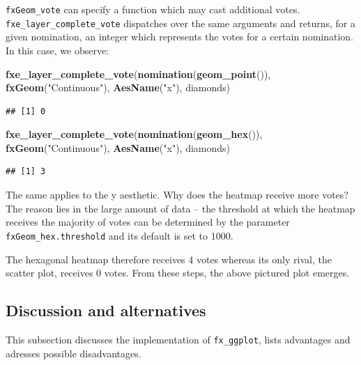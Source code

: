 \documentclass[]{report}
\newenvironment{Shaded}{\begin{snugshade}}{\end{snugshade}}
\newcommand{\KeywordTok}[1]{\textcolor[rgb]{0.13,0.29,0.53}{\textbf{#1}}}
\newcommand{\StringTok}[1]{\textcolor[rgb]{0.31,0.60,0.02}{#1}}
\newcommand{\NormalTok}[1]{#1}
\theoremstyle{definition}
\theoremstyle{definition}
\theoremstyle{definition}
\theoremstyle{remark}
\begin{document}
\texttt{fxGeom\_vote} can specify a function which may cast additional
votes. \texttt{fxe\_layer\_complete\_vote} dispatches over the same
arguments and returns, for a given nomination, an integer which
represents the votes for a certain nomination. In this case, we observe:

\begin{Shaded}
\begin{Highlighting}[]
\KeywordTok{fxe_layer_complete_vote}\NormalTok{(}\KeywordTok{nomination}\NormalTok{(}\KeywordTok{geom_point}\NormalTok{()), }\KeywordTok{fxGeom}\NormalTok{(}\StringTok{"Continuous"}\NormalTok{), }\KeywordTok{AesName}\NormalTok{(}\StringTok{"x"}\NormalTok{), diamonds)}
\end{Highlighting}
\end{Shaded}

\begin{verbatim}
## [1] 0
\end{verbatim}

\begin{Shaded}
\begin{Highlighting}[]
\KeywordTok{fxe_layer_complete_vote}\NormalTok{(}\KeywordTok{nomination}\NormalTok{(}\KeywordTok{geom_hex}\NormalTok{()), }\KeywordTok{fxGeom}\NormalTok{(}\StringTok{"Continuous"}\NormalTok{), }\KeywordTok{AesName}\NormalTok{(}\StringTok{"x"}\NormalTok{), diamonds)}
\end{Highlighting}
\end{Shaded}

\begin{verbatim}
## [1] 3
\end{verbatim}

The same applies to the y aesthetic. Why does the heatmap receive more
votes? The reason lies in the large amount of data -- the threshold at
which the heatmap receives the majority of votes can be determined by
the parameter \texttt{fxGeom\_hex.threshold} and its default is set to
1000.

The hexagonal heatmap therefore receives 4 votes whereas its only rival,
the scatter plot, receives 0 votes. From these steps, the above pictured
plot emerges.

\subsection{Discussion and
alternatives}\label{discussion-and-alternatives}

This subsection discusses the implementation of \texttt{fx\_ggplot},
lists advantages and adresses possible disadvantages.
\end{document}
